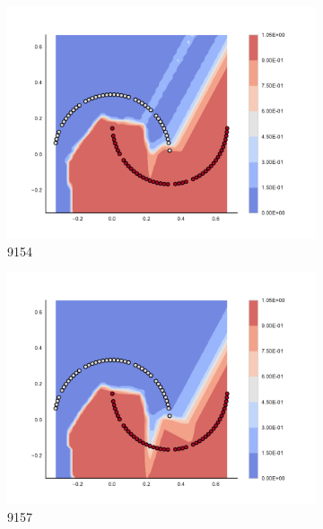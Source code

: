 \begin{figure}[h]
\begin{subfigure}[b]{0.09\textwidth}
    \includegraphics[clip, trim=2.35cm 1.75cm 4.5cm 0cm,width=\textwidth]{img/convergence/9154.pdf}
    \caption{9154}
    \label{fig:convergence_9154}
\end{subfigure}
%
\begin{subfigure}[b]{0.09\textwidth}
    \includegraphics[clip, trim=2.35cm 1.75cm 4.5cm 0cm,width=\textwidth]{img/convergence/9157.pdf}
    \caption{9157}
    \label{fig:convergence_9157}
\end{subfigure}
%
\begin{subfigure}[b]{0.09\textwidth}

\end{subfigure}
\end{figure}
